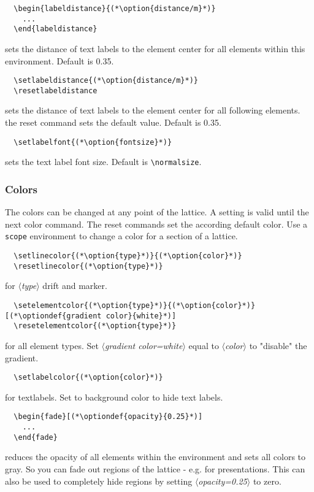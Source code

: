 \documentclass[a4paper]{scrartcl}
\newcommand{\option}[1]{{\color{blue}$\langle$\textit{#1}$\rangle$}}
\newcommand{\optiondef}[2]{{\color{green!50!black}$\langle$\textit{#1=#2}$\rangle$}}
\begin{document}
\begin{lstlisting}
  \begin{labeldistance}{(*\option{distance/m}*)}
    ...
  \end{labeldistance}
\end{lstlisting}
sets the distance of text labels to the element center for all elements within this
environment. Default is 0.35.

\begin{lstlisting}
  \setlabeldistance{(*\option{distance/m}*)}
  \resetlabeldistance
\end{lstlisting}
sets the distance of text labels to the element center for all following elements. the
reset command sets the default value. Default is 0.35.

\begin{lstlisting}
  \setlabelfont{(*\option{fontsize}*)}
\end{lstlisting}
sets the text label font size. Default is \lstinline+\normalsize+.



\subsubsection{Colors}
\label{sec:colors}
The colors can be changed at any point of the lattice. A setting is valid until the next
color command. The reset commands set the according default color. Use a \lstinline+scope+
environment to change a color for a section of a lattice.

\begin{lstlisting}
  \setlinecolor{(*\option{type}*)}{(*\option{color}*)}
  \resetlinecolor{(*\option{type}*)}
\end{lstlisting}
for \option{type} drift and marker.

\begin{lstlisting}
  \setelementcolor{(*\option{type}*)}{(*\option{color}*)}[(*\optiondef{gradient color}{white}*)]
  \resetelementcolor{(*\option{type}*)}
\end{lstlisting}
for all element types. Set \optiondef{gradient color}{white} equal to \option{color} to
"disable" the gradient.

\begin{lstlisting}
  \setlabelcolor{(*\option{color}*)}
\end{lstlisting}
for textlabels. Set to background color to hide text labels.


\begin{lstlisting}
  \begin{fade}[(*\optiondef{opacity}{0.25}*)]
    ...
  \end{fade}
\end{lstlisting}
 reduces the opacity of all elements within the environment and sets all colors to gray.
 So you can fade out regions of the lattice - e.g. for presentations.
 This can also be used to completely hide regions by setting \optiondef{opacity}{0.25} to zero.
\end{document}
